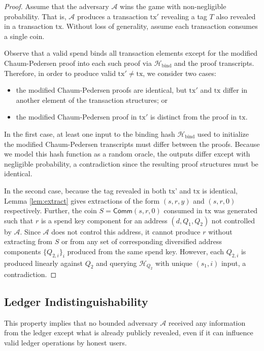 \documentclass{llncs}
\newcommand{\hash}{\mathcal{H}}
\newcommand{\func}[1]{\mathsf{#1}}
\newcommand{\comm}{\func{Comm}}
\begin{document}
\begin{proof}
Assume that the adversary $\mathcal{A}$ wins the game with non-negligible probability.
That is, $\mathcal{A}$ produces a transaction $\text{tx}'$ revealing a tag $T$ also revealed in a transaction $\text{tx}$.
Without loss of generality, assume each transaction consumes a single coin.

Observe that a valid spend binds all transaction elements except for the modified Chaum-Pedersen proof into each such proof via $\hash_{\text{bind}}$ and the proof transcripts.
Therefore, in order to produce valid $\text{tx}' \neq \text{tx}$, we consider two cases:
\begin{itemize}
    \item the modified Chaum-Pedersen proofs are identical, but $\text{tx}'$ and $\text{tx}$ differ in another element of the transaction structures; or
    \item the modified Chaum-Pedersen proof in $\text{tx}'$ is distinct from the proof in $\text{tx}$.
\end{itemize}

In the first case, at least one input to the binding hash $\hash_{\text{bind}}$ used to initialize the modified Chaum-Pedersen transcripts must differ between the proofs.
Because we model this hash function as a random oracle, the outputs differ except with negligible probability, a contradiction since the resulting proof structures must be identical.

In the second case, because the tag revealed in both $\text{tx'}$ and $\text{tx}$ is identical, Lemma \ref{lem:extract} gives extractions of the form $(s,r,y)$ and $(s,r,0)$ respectively.
Further, the coin $S = \comm(s,r,0)$ consumed in $\text{tx}$ was generated such that $r$ is a spend key component for an address $(d,Q_1,Q_2)$ not controlled by $\mathcal{A}$.
Since $\mathcal{A}$ does not control this address, it cannot produce $r$ without extracting from $S$ or from any set of corresponding diversified address components $\{Q_{2,i}\}_i$ produced from the same spend key.
However, each $Q_{2,i}$ is produced linearly against $Q_2$ and querying $\hash_{Q_2}$ with unique $(s_1,i)$ input, a contradiction.
\end{proof}


\subsection{Ledger Indistinguishability}

This property implies that no bounded adversary $\mathcal{A}$ received any information from the ledger except what is already publicly revealed, even if it can influence valid ledger operations by honest users.
\end{document}
